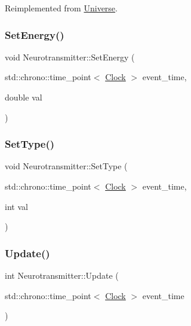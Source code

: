Reimplemented from \mbox{\hyperlink{classUniverse_aa22202ae740eb1355529afcb13285e91}{Universe}}.

\mbox{\label{classNeurotransmitter_a5ad51ddb1351868e1756e3c41bb88e04}} 
\subsubsection{\texorpdfstring{Set\+Energy()}{SetEnergy()}}
{\footnotesize\ttfamily void Neurotransmitter\+::\+Set\+Energy (\begin{DoxyParamCaption}\item[{std\+::chrono\+::time\+\_\+point$<$ \mbox{\hyperlink{universe_8h_a0ef8d951d1ca5ab3cfaf7ab4c7a6fd80}{Clock}} $>$}]{event\+\_\+time,  }\item[{double}]{val }\end{DoxyParamCaption})\hspace{0.3cm}{\ttfamily [inline]}}

\mbox{\label{classNeurotransmitter_ae460ed5fac92ba136a80bba12ebce246}} 
\subsubsection{\texorpdfstring{Set\+Type()}{SetType()}}
{\footnotesize\ttfamily void Neurotransmitter\+::\+Set\+Type (\begin{DoxyParamCaption}\item[{std\+::chrono\+::time\+\_\+point$<$ \mbox{\hyperlink{universe_8h_a0ef8d951d1ca5ab3cfaf7ab4c7a6fd80}{Clock}} $>$}]{event\+\_\+time,  }\item[{int}]{val }\end{DoxyParamCaption})\hspace{0.3cm}{\ttfamily [inline]}}

\mbox{\label{classNeurotransmitter_ac9f7be22ca7242207de76ec5e1b055b1}} 
\subsubsection{\texorpdfstring{Update()}{Update()}}
{\footnotesize\ttfamily int Neurotransmitter\+::\+Update (\begin{DoxyParamCaption}\item[{std\+::chrono\+::time\+\_\+point$<$ \mbox{\hyperlink{universe_8h_a0ef8d951d1ca5ab3cfaf7ab4c7a6fd80}{Clock}} $>$}]{event\+\_\+time }\end{DoxyParamCaption})}



